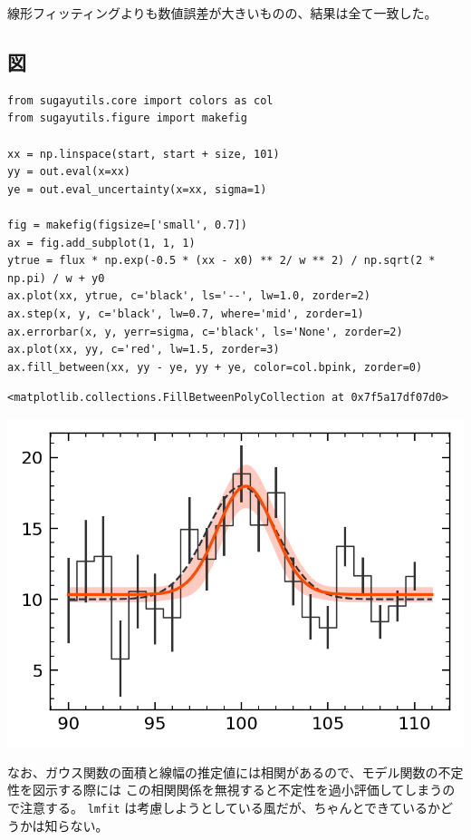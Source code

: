 \documentclass[a4paper, 8pt, notitlepage, uplatex, dvipdfmx]{jsarticle}
\begin{document}
線形フィッティングよりも数値誤差が大きいものの、結果は全て一致した。
\subsection{図}
\label{sec:org1331f13}
\begin{verbatim}
from sugayutils.core import colors as col
from sugayutils.figure import makefig

xx = np.linspace(start, start + size, 101)
yy = out.eval(x=xx)
ye = out.eval_uncertainty(x=xx, sigma=1)

fig = makefig(figsize=['small', 0.7])
ax = fig.add_subplot(1, 1, 1)
ytrue = flux * np.exp(-0.5 * (xx - x0) ** 2/ w ** 2) / np.sqrt(2 * np.pi) / w + y0
ax.plot(xx, ytrue, c='black', ls='--', lw=1.0, zorder=2)
ax.step(x, y, c='black', lw=0.7, where='mid', zorder=1)
ax.errorbar(x, y, yerr=sigma, c='black', ls='None', zorder=2)
ax.plot(xx, yy, c='red', lw=1.5, zorder=3)
ax.fill_between(xx, yy - ye, yy + ye, color=col.bpink, zorder=0)
\end{verbatim}

\label{}
\begin{verbatim}
<matplotlib.collections.FillBetweenPolyCollection at 0x7f5a17df07d0>
\end{verbatim}

\begin{center}
\includegraphics[width=1.0\linewidth]{./obipy-resources/gauss.png}
\end{center}

なお、ガウス関数の面積と線幅の推定値には相関があるので、モデル関数の不定性を図示する際には
この相関関係を無視すると不定性を過小評価してしまうので注意する。
\texttt{lmfit} は考慮しようとしている風だが、ちゃんとできているかどうかは知らない。
\end{document}

